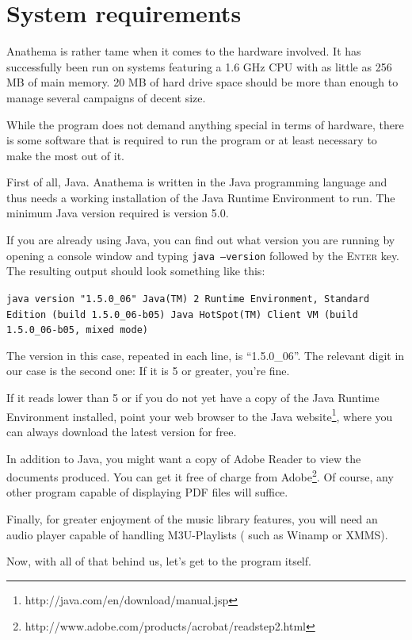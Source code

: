 \section{System requirements}
Anathema is rather tame when it comes to the hardware involved. It has successfully been run on systems featuring a 1.6 GHz CPU with as little as 256 MB of main memory. 20 MB of hard drive space should be more than enough to manage several campaigns of decent size.

While the program does not demand anything special in terms of hardware, there is some software that is required to run the program or at least necessary to make the most out of it.

First of all, Java. Anathema is written in the Java programming language and thus needs a working installation of the Java Runtime Environment to run. The minimum Java version required is version 5.0.

If you are already using Java, you can find out what version you are running by opening a console window and typing \texttt{java --version} followed by the \textsc{Enter} key. The resulting output should look something like this:
\medskip

\small
\texttt{java version "1.5.0\_06"
\newline
Java(TM) 2 Runtime Environment, Standard Edition (build 1.5.0\_06-b05)
\newline
Java HotSpot(TM) Client VM (build 1.5.0\_06-b05, mixed mode)}
\medskip

\normalsize
The version in this case, repeated in each line, is ``1.5.0\_06''. The relevant digit in our case is the second one: If it is 5 or greater, you're fine.

If it reads lower than 5 or if you do not yet have a copy of the Java Runtime Environment installed, point your web browser to the Java website\footnote{http://java.com/en/download/manual.jsp}, where you can always download the latest version for free.
\medskip

In addition to Java, you might want a copy of Adobe Reader to view the documents produced. You can get it free of charge from Adobe\footnote{http://www.adobe.com/products/acrobat/readstep2.html}. Of course, any other program capable of displaying PDF files will suffice.

Finally, for greater enjoyment of the music library features, you will need an audio player capable of handling M3U-Playlists ( such as Winamp or XMMS).
\medskip

Now, with all of that behind us, let's get to the program itself.


